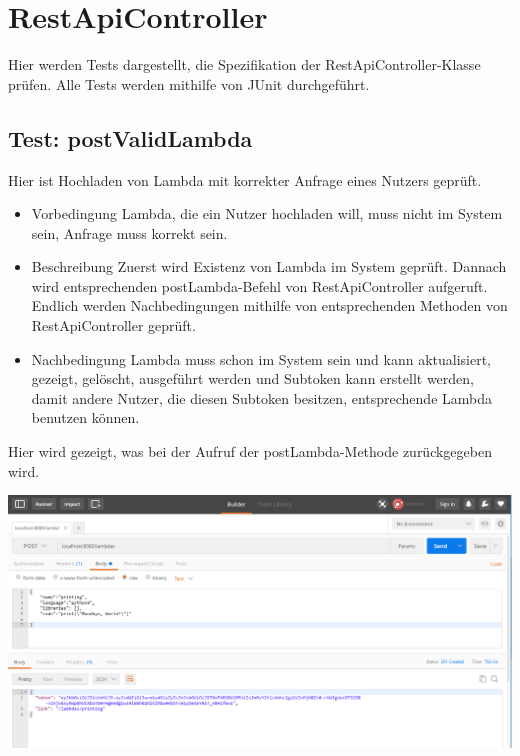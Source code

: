 \documentclass[a4paper,20pt,oneside]{book}
\begin{document}
\newpage
\section{RestApiController}
Hier werden Tests dargestellt, die Spezifikation der RestApiController-Klasse prüfen. Alle Tests werden mithilfe von JUnit durchgeführt.

\subsection{Test: postValidLambda}
Hier ist Hochladen von Lambda mit korrekter Anfrage eines Nutzers geprüft. 
\begin{itemize}
	\item Vorbedingung \linebreak
	Lambda, die ein Nutzer hochladen will, muss nicht im System sein, Anfrage muss korrekt sein.
	\item Beschreibung \linebreak
	Zuerst wird Existenz von Lambda im System geprüft. Dannach wird entsprechenden postLambda-Befehl von RestApiController aufgeruft. Endlich werden Nachbedingungen mithilfe von  entsprechenden Methoden von RestApiController geprüft.
	\item Nachbedingung \linebreak
	Lambda muss schon im System sein und kann aktualisiert, gezeigt, gelöscht, ausgeführt werden und Subtoken kann erstellt werden, damit andere Nutzer, die diesen Subtoken besitzen, entsprechende Lambda benutzen können.
\end{itemize}

Hier wird gezeigt, was bei der Aufruf der postLambda-Methode zurückgegeben wird.

\vspace{0.5cm}
	\includegraphics[width=\textwidth]{postmanEx.png}
	
\end{document}
